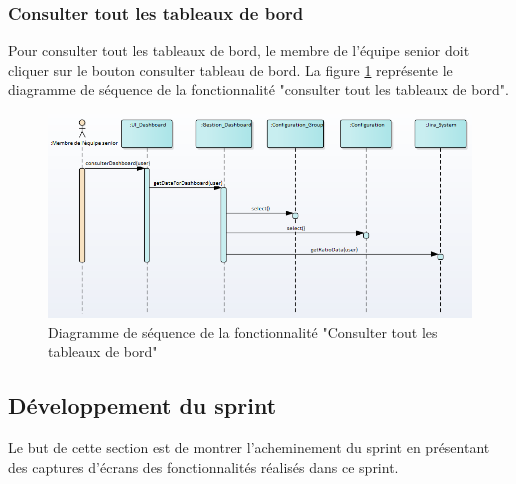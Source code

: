 \subsubsection{Consulter tout les tableaux de bord}
Pour consulter tout les tableaux de bord, le membre de l'équipe senior doit cliquer sur le bouton consulter tableau de bord.
La figure \ref{code59} représente le diagramme de séquence de la fonctionnalité "consulter tout les tableaux de bord".
\begin{figure}[H]
  \centering
 \includegraphics[scale=0.69]{figures/diagrams/sequence/consulteralldashboard_seq_diag.png}
 \caption{Diagramme de séquence de la fonctionnalité "Consulter tout les tableaux de bord"}
 \label{code59}
\end{figure}

\subsection{Développement du sprint}
Le but de cette section est de montrer l'acheminement du sprint en présentant des captures d'écrans des fonctionnalités réalisés dans ce sprint.

